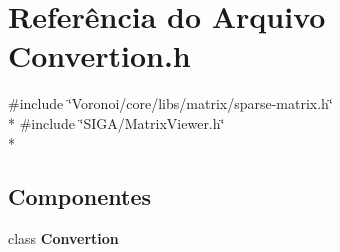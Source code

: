 \section{Referência do Arquivo Convertion.\+h}
\label{_convertion_8h}
{\ttfamily \#include \char`\"{}Voronoi/core/libs/matrix/sparse-\/matrix.\+h\char`\"{}}\\*
{\ttfamily \#include \char`\"{}S\+I\+G\+A/\+Matrix\+Viewer.\+h\char`\"{}}\\*
\subsection*{Componentes}
\begin{DoxyCompactItemize}
\item 
class {\bf Convertion}
\end{DoxyCompactItemize}
